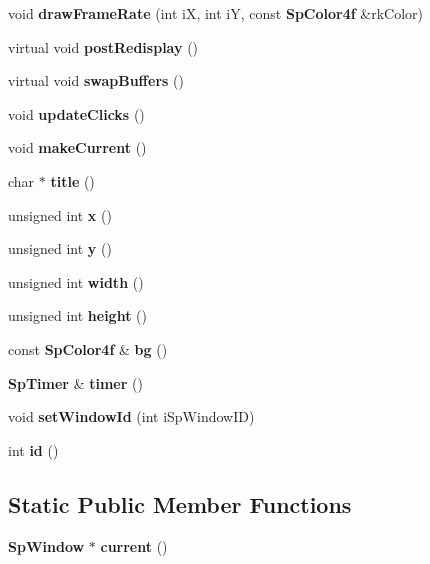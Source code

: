 \begin{CompactItemize}
void {\bf draw\-Frame\-Rate} (int i\-X, int i\-Y, const {\bf Sp\-Color4f} \&rk\-Color)
\item 
virtual void {\bf post\-Redisplay} ()
\item 
virtual void {\bf swap\-Buffers} ()
\item 
void {\bf update\-Clicks} ()
\item 
void {\bf make\-Current} ()
\item 
char $\ast$ {\bf title} ()
\item 
unsigned int {\bf x} ()
\item 
unsigned int {\bf y} ()
\item 
unsigned int {\bf width} ()
\item 
unsigned int {\bf height} ()
\item 
const {\bf Sp\-Color4f} \& {\bf bg} ()
\item 
{\bf Sp\-Timer} \& {\bf timer} ()
\item 
void {\bf set\-Window\-Id} (int i\-Sp\-Window\-ID)
\item 
int {\bf id} ()
\end{CompactItemize}
\subsection*{Static Public Member Functions}
\begin{CompactItemize}
\item 
{\bf Sp\-Window} $\ast$ {\bf current} ()
\end{CompactItemize}
